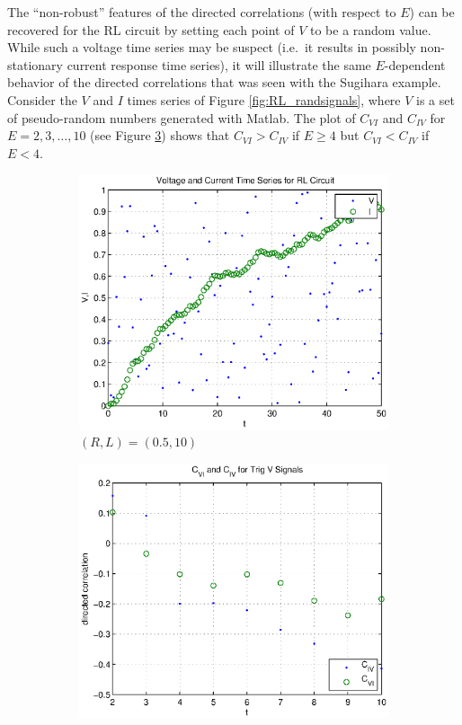 \documentclass[a4paper,11pt]{article}
\begin{document}
The ``non-robust'' features of the directed correlations (with respect to $E$) can be recovered for the RL circuit by setting each point of $V$ to be a random value.  While such a voltage time series may be suspect (i.e.\ it results in possibly non-stationary current response time series), it will illustrate the same $E$-dependent behavior of the directed correlations that was seen with the Sugihara example.  Consider the $V$ and $I$ times series of Figure \ref{fig:RL_randsignals}, where $V$ is a set of pseudo-random numbers generated with Matlab.  The plot of $C_{VI}$ and $C_{IV}$ for $E=2,3,\ldots,10$ (see Figure \ref{fig:RL_randsignalsCCM}) shows that $C_{VI}>C_{IV}$ if $E\ge 4$ but $C_{VI}<C_{IV}$ if $E<4$.
\begin{figure}[h!t]
\centering
\begin{subfigure}[b]{0.4\textwidth}
\label{fig:RL_randsignals.eps}
\includegraphics[scale=0.55]{RL_randsignals.eps}
\caption{$(R,L) = (0.5,10)$}
\end{subfigure}
\begin{subfigure}[b]{0.4\textwidth}
\label{fig:RL_randsignalsCCM}
\includegraphics[scale=0.55]{RL_randsignalsCCM.eps}

\end{subfigure}
\end{figure}
\end{document}
